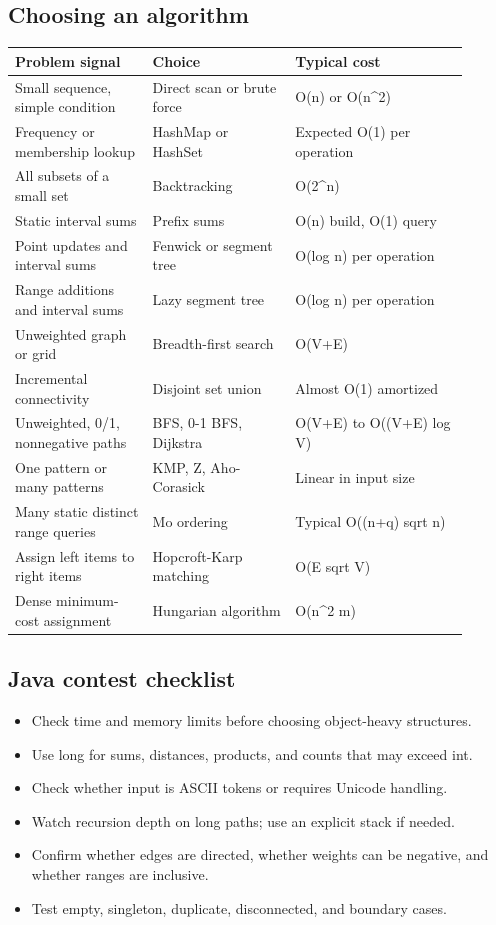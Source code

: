 \documentclass[10pt,letterpaper]{article}
\begin{document}
\subsection*{Choosing an algorithm}
\small\begin{longtable}{>{\raggedright\arraybackslash}p{0.27\linewidth}>{\raggedright\arraybackslash}p{0.29\linewidth}>{\raggedright\arraybackslash}p{0.34\linewidth}}\toprule
\textbf{Problem signal} & \textbf{Choice} & \textbf{Typical cost}\\\midrule\endhead
Small sequence, simple condition & Direct scan or brute force & O(n) or O(n\textasciicircum{}2)\\
Frequency or membership lookup & HashMap or HashSet & Expected O(1) per operation\\
All subsets of a small set & Backtracking & O(2\textasciicircum{}n)\\
Static interval sums & Prefix sums & O(n) build, O(1) query\\
Point updates and interval sums & Fenwick or segment tree & O(log n) per operation\\
Range additions and interval sums & Lazy segment tree & O(log n) per operation\\
Unweighted graph or grid & Breadth-first search & O(V+E)\\
Incremental connectivity & Disjoint set union & Almost O(1) amortized\\
Unweighted, 0/1, nonnegative paths & BFS, 0-1 BFS, Dijkstra & O(V+E) to O((V+E) log V)\\
One pattern or many patterns & KMP, Z, Aho-Corasick & Linear in input size\\
Many static distinct range queries & Mo ordering & Typical O((n+q) sqrt n)\\
Assign left items to right items & Hopcroft-Karp matching & O(E sqrt V)\\
Dense minimum-cost assignment & Hungarian algorithm & O(n\textasciicircum{}2 m)\\
\bottomrule\end{longtable}\normalsize
\subsection*{Java contest checklist}
\begin{guidebox}\begin{itemize}
\item Check time and memory limits before choosing object-heavy structures.
\item Use long for sums, distances, products, and counts that may exceed int.
\item Check whether input is ASCII tokens or requires Unicode handling.
\item Watch recursion depth on long paths; use an explicit stack if needed.
\item Confirm whether edges are directed, whether weights can be negative, and whether ranges are inclusive.
\item Test empty, singleton, duplicate, disconnected, and boundary cases.
\end{itemize}\end{guidebox}
\end{document}
